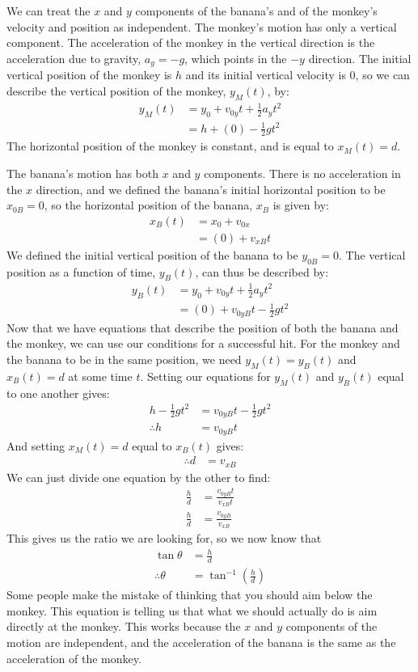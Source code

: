 \begin{example}
We can treat the $x$ and $y$ components of the banana's and of the monkey's velocity and position as independent. The monkey's motion has only a vertical component. The acceleration of the monkey in the vertical direction is the acceleration due to gravity, $a_y=-g$, which points in the $-y$ direction. The initial vertical position of the monkey is $h$ and its initial vertical velocity is 0, so we can describe the vertical position of the monkey, $y_M(t)$, by:
\begin{align*}
y_M(t)&=y_0+v_{0y}t+\frac{1}{2}a_yt^2\\
&=h+(0)-\frac{1}{2}gt^2
\end{align*}
The horizontal position of the monkey is constant, and is equal to $x_M(t)=d$.

The banana's motion has both $x$ and $y$ components. There is no acceleration in the $x$ direction, and we defined the banana's initial horizontal position to be $x_{0B}=0$, so the horizontal position of the banana, $x_B$ is given by:
\begin{align*}
x_B(t)&=x_{0}+v_{0x}\\
&=(0)+v_{xB}t
\end{align*}
We defined the initial vertical position of the banana to be $y_{0B}=0$. The vertical position as a function of time, $y_B(t)$, can thus be described by:
\begin{align*}
y_B(t)&=y_0+v_{0y}t+\frac{1}{2}a_yt^2\\
&=(0)+v_{0yB}t-\frac{1}{2}gt^2
\end{align*}
Now that we have equations that describe the position of both the banana and the monkey, we can use our conditions for a successful hit. For the monkey and the banana to be in the same position, we need $y_M(t)=y_B(t)$ and $x_B(t)=d$ at some time $t$. Setting our equations for $y_M(t)$ and $y_B(t)$ equal to one another gives:
\begin{align*}
h-\frac{1}{2} gt^2&=v_{0yB}t-\frac{1}{2}gt^2\\
\therefore h&=v_{0yB}t
\end{align*}
And setting $x_M(t)=d$ equal to $x_B(t)$ gives:
\begin{align*}
\therefore d&=v_{xB}
\end{align*} 
We can just divide one equation by the other to find:
\begin{align*}
\frac{h}{d}&=\frac{v_{0yB}t}{v_{xB}t}\\
\frac{h}{d}&=\frac{v_{0yB}}{v_{xB}}
\end{align*}
This gives us the ratio we are looking for, so we now know that
\begin{align*}
\tan\theta&=\frac{h}{d}\\
\therefore \theta&=\tan^{-1}\left(\frac{h}{d}\right)
\end{align*}
Some people make the mistake of thinking that you should aim below the monkey. This equation is telling us that what we should actually do is aim directly at the monkey. This works because the $x$ and $y$ components of the motion are independent, and the acceleration of the banana is the same as the acceleration of the monkey. 

\end{example} 

